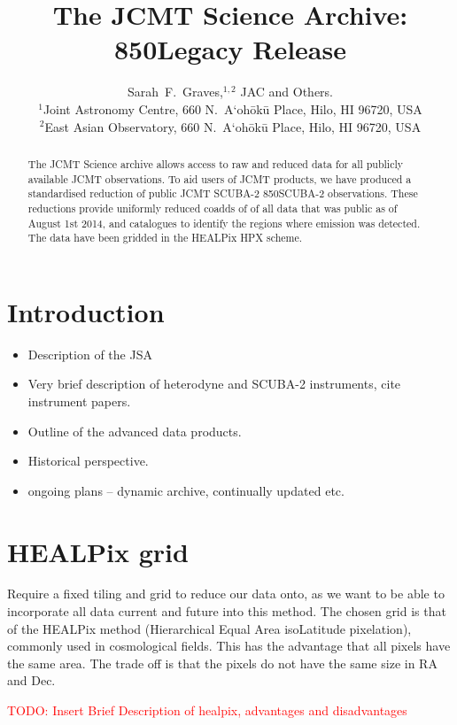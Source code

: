 \documentclass[usenatbib]{mn2e}
\title{The JCMT Science Archive: 850\micron Legacy Release}
\author[S.~F.~Graves et~al.]
{Sarah~F.~Graves,$^{1,2}$
JAC
and
Others.\\
$^1$Joint Astronomy Centre, 660 N.\ A`oh\=ok\=u Place, Hilo, HI 96720, USA\\
$^2$East Asian Observatory, 660 N.\ A`oh\=ok\=u Place, Hilo, HI 96720, USA
}
\newcommand{\todo}[1]{\textcolor{red}{TODO: #1}}
\begin{document}
\maketitle

\begin{abstract}

  The JCMT Science archive allows access to raw and reduced data for
  all publicly available JCMT observations. To aid users of JCMT
  products, we have produced a standardised reduction of public JCMT
  SCUBA-2 850\micron SCUBA-2 observations. These reductions provide
  uniformly reduced coadds of of all data that was public as of August
  1st 2014, and catalogues to identify the regions where emission was
  detected. The data have been gridded in the HEALPix HPX scheme.
\end{abstract}

\section{Introduction}
\begin{itemize}
\item Description of the JSA \citep{2015Economou}
\item Very brief description of heterodyne and SCUBA-2 instruments, cite instrument papers. \citep{2013MNRAS.430.2513H} \citep{2009MNRAS.399.1026B}
\item Outline of the advanced data products. \citep{2014SPIE.9152E..2JB}
\item Historical perspective. \citep{2011ASPC..442..203E}
\item ongoing plans -- dynamic archive, continually updated etc.
\end{itemize}



\section{HEALPix grid }
Require a fixed tiling and grid to reduce our data onto, as we want to be able to
incorporate all data current and future into this method. The chosen
grid is that of the HEALPix method (Hierarchical Equal Area
isoLatitude pixelation), commonly used in cosmological fields. This
has the advantage that all pixels have the same area. The trade off is
that the pixels do not have the same size in RA and Dec.

\todo{Insert Brief Description of healpix, advantages and
  disadvantages}
\end{document}
